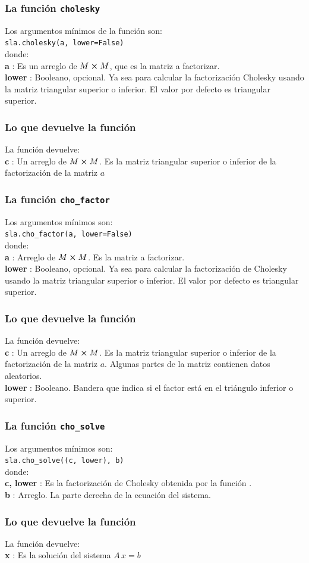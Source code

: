 \begin{frame}[fragile]
\frametitle{La función \texttt{cholesky}}
Los argumentos mínimos de la función son:
\\
\medskip
\verb|sla.cholesky(a, lower=False)|
\\
\medskip
donde:
\\
\textbf{a} : Es un arreglo de $M \cp M$, que es la matriz a factorizar.
\\
\medskip
\textbf{lower} : Booleano, opcional. Ya sea para calcular la factorización Cholesky usando la matriz triangular superior o inferior. El valor por defecto es triangular superior.
\end{frame}
\begin{frame}
\frametitle{Lo que devuelve la función}
La función devuelve:
\\
\medskip
\textbf{c} : Un arreglo de $M \cp M$. Es la matriz triangular superior o inferior de la factorización de la matriz $a$
\end{frame}
\begin{frame}[fragile]
\frametitle{La función \texttt{cho\_factor}}
Los argumentos mínimos son:
\\
\medskip
\verb|sla.cho_factor(a, lower=False)|
\\
\medskip
donde:
\\
\textbf{a} : Arreglo de $M \cp M$. Es la matriz a factorizar.
\\
\medskip
\textbf{lower} : Booleano, opcional.  Ya sea para calcular la factorización de Cholesky usando la matriz triangular superior o inferior. El valor por defecto es triangular superior.
\end{frame}
\begin{frame}
\frametitle{Lo que devuelve la función}
La función devuelve:
\\
\medskip
\textbf{c} : Un arreglo de $M \cp M$. Es la matriz triangular superior o inferior de la factorización de la matriz $a$. Algunas partes de la matriz contienen datos aleatorios.
\\
\medskip
\textbf{lower} : Booleano. Bandera que indica si el factor está en el triángulo inferior o superior.
\end{frame}
\begin{frame}[fragile]
\frametitle{La función \texttt{cho\_solve}}
Los argumentos mínimos son:
\\
\medskip
\verb|sla.cho_solve((c, lower), b)|
\\
\medskip
donde:
\\
\textbf{c, lower} : Es la factorización de Cholesky obtenida por la función .
\\
\medskip
\textbf{b} : Arreglo.  La parte derecha de la ecuación del sistema.
\end{frame}
\begin{frame}
\frametitle{Lo que devuelve la función}
La función devuelve:
\\
\medskip
\textbf{x }: Es la solución del sistema $A \, x =  b$
\end{frame}
